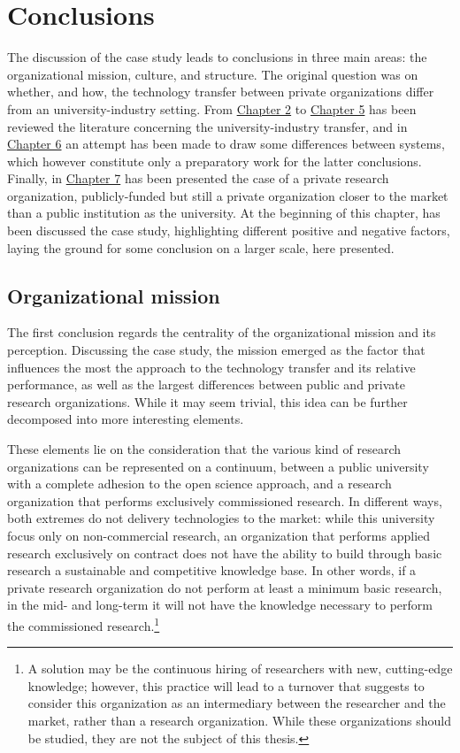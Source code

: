 \section{Conclusions}

The discussion of the case study leads to conclusions in three main areas: the organizational mission, culture, and structure. The original question was on whether, and how, the technology transfer between private organizations differ from an university-industry setting. From \hyperref[Chapter2]{Chapter 2} to \hyperref[Chapter5]{Chapter 5} has been reviewed the literature concerning the university-industry transfer, and in \hyperref[Chapter6]{Chapter 6} an attempt has been made to draw some differences between systems, which however constitute only a preparatory work for the latter conclusions. Finally, in \hyperref[Chapter7]{Chapter 7} has been presented the case of a private research organization, publicly-funded but still a private organization closer to the market than a public institution as the university. At the beginning of this chapter, has been discussed the case study, highlighting different positive and negative factors, laying the ground for some conclusion on a larger scale, here presented.

\subsection{Organizational mission}

The first conclusion regards the centrality of the organizational mission and its perception. Discussing the case study, the mission emerged as the factor that influences the most the approach to the technology transfer and its relative performance, as well as the largest differences between public and private research organizations. While it may seem trivial, this idea can be further decomposed into more interesting elements.

These elements lie on the consideration that the various kind of research organizations can be represented on a continuum, between a public university with a complete adhesion to the open science approach, and a research organization that performs exclusively commissioned research. In different ways, both extremes do not delivery technologies to the market: while this university focus only on non-commercial research, an organization that performs applied research exclusively on contract does not have the ability to build through basic research a sustainable and competitive knowledge base. In other words, if a private research organization do not perform at least a minimum basic research, in the mid- and long-term it will not have the knowledge necessary to perform the commissioned research.\footnote{A solution may be the continuous hiring of researchers with new, cutting-edge knowledge; however, this practice will lead to a turnover that suggests to consider this organization as an intermediary between the researcher and the market, rather than a research organization. While these organizations should be studied, they are not the subject of this thesis.}

